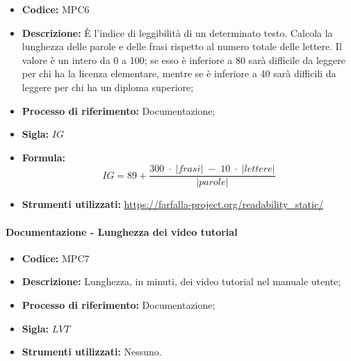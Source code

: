     \begin{itemize}
        \item \textbf{Codice:} MPC6
        \item \textbf{Descrizione:} È l'indice di leggibilità di un determinato testo. Calcola la lunghezza delle parole e delle frasi rispetto al numero totale delle lettere. Il valore è un intero da 0 a 100; se esso è inferiore a 80 sarà difficile da leggere per chi ha la licenza elementare, mentre se è inferiore a 40 sarà difficili da leggere per chi ha un diploma superiore;
        \item \textbf{Processo di riferimento:} Documentazione;
        \item \textbf{Sigla:} $IG$
        \item \textbf{Formula:} $$IG = 89 + {\frac{300 \; \cdot \; |frasi| \; - \; 10 \; \cdot \; |lettere|}{|parole|}}$$
        \item \textbf{Strumenti utilizzati:} \url{https://farfalla-project.org/readability_static/}
    \end{itemize}

\paragraph{Documentazione - Lunghezza dei video tutorial}
\begin{itemize}
    \item \textbf{Codice:} MPC7
    \item \textbf{Descrizione:} Lunghezza, in minuti, dei video tutorial nel manuale utente;
    \item \textbf{Processo di riferimento:} Documentazione;
    \item \textbf{Sigla:} $LVT$
    \item \textbf{Strumenti utilizzati:} Nessuno.
\end{itemize}

